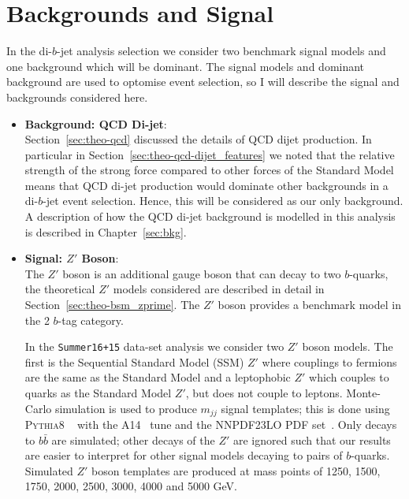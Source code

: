 \section{Backgrounds and Signal}
\label{sec:evt-s+b}

In the di-$b$-jet analysis selection we consider two
benchmark signal models and one background which will be dominant.
The signal models and dominant background are
used to optomise event selection, so I will describe
the signal and backgrounds considered here.

\begin{itemize}[leftmargin=*]
\item\textbf{Background: QCD Di-jet}: \\
  Section~\ref{sec:theo-qcd} discussed the details of QCD dijet production.
  In particular in Section~\ref{sec:theo-qcd-dijet_features} we noted that the
  relative strength of the strong force compared to other forces
  of the Standard Model means that
  QCD di-jet production would dominate other backgrounds in a di-$b$-jet event selection.
  Hence, this will be considered as our only background.
  A description of how the QCD di-jet background is modelled in this analysis is described in Chapter~\ref{sec:bkg}.\\

\item\textbf{Signal: $Z'$ Boson}: \\
  The $Z'$ boson is an additional gauge boson that can decay to two $b$-quarks,
  the theoretical $Z'$ models considered are
  described in detail in Section~\ref{sec:theo-bsm_zprime}.
  The $Z'$ boson provides a benchmark model in the 2 $b$-tag category.

  In the \verb|Summer16+15| data-set analysis we consider two $Z'$ boson models.
  The first is the Sequential Standard Model (SSM) $Z'$ where couplings to fermions
  are the same as the Standard Model and a leptophobic $Z'$ which couples to quarks
  as the Standard Model $Z'$, but does not couple to leptons.
  Monte-Carlo simulation is used to produce $m_{jj}$ signal templates;
  this is done using \textsc{Pythia8} ~\cite{dibjet-pythia8} with the A14~\cite{dibjet-a14} tune and the NNPDF23LO PDF set~\cite{dibjet-nnpdf}.
  Only decays to $b\bar{b}$ are simulated;
  other decays of the  $Z'$  are ignored such that our
  results are easier to interpret for other signal models decaying to pairs of $b$-quarks.
  Simulated $Z'$ boson templates are produced at mass points of
  1250, 1500, 1750, 2000, 2500, 3000, 4000 and 5000 GeV.
  

\end{itemize}
